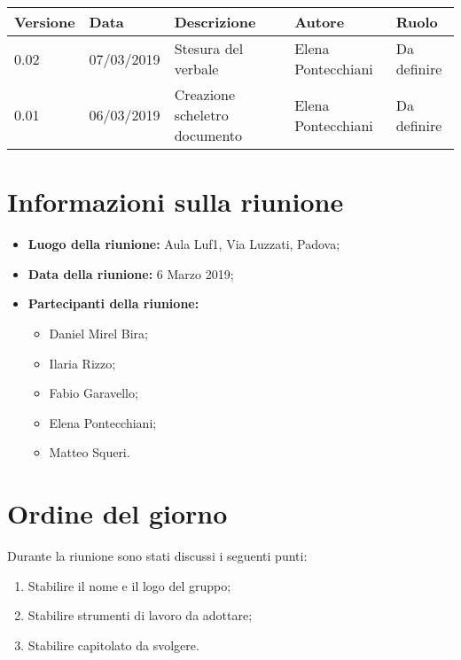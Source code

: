\documentclass[a4paper, oneside, openany, dvipsnames, table]{article}
\begin{document}
\begin{center}

{\renewcommand\arraystretch{1.2} 

\begin{tabular}{|p{2.3cm}|p{2.3cm}|p{2.3cm}|p{2.3cm}|p{2.3cm}|}

\hline
\rowcolor[gray]{.9}\textbf{Versione}          & \textbf{Data}        &  \textbf{Descrizione}          & \textbf{Autore }       &\textbf{Ruolo}                \\ \hline
\rowcolor[gray]{.7} 0.02     & 07/03/2019    & Stesura del verbale     & Elena Pontecchiani     & Da definire \\
\rowcolor[gray]{.8} 0.01     & 06/03/2019    & Creazione scheletro documento     & Elena Pontecchiani     & Da definire \\
\hline
          

\end{tabular}}
\end{center}
\newpage
\tableofcontents
\newpage
\section{Informazioni sulla riunione}
\begin{itemize}
	\item \textbf{Luogo della riunione:} Aula Luf1, Via Luzzati, Padova;
	\item \textbf{Data della riunione:} 6 Marzo 2019;
	
	\item \textbf{Partecipanti della riunione:}
		\begin{itemize}
			\item Daniel Mirel Bira;
			\item Ilaria Rizzo;
			\item Fabio Garavello;
			\item Elena Pontecchiani;
			\item Matteo Squeri.
		\end{itemize}
\end{itemize}


	
	
	
\newpage
\section{Ordine del giorno}
Durante la riunione sono stati discussi i seguenti punti:
\begin{enumerate}
	\item Stabilire il nome e il logo del gruppo;
	\item Stabilire strumenti di lavoro da adottare;
	\item Stabilire capitolato da svolgere.
		
\end{enumerate}
	
\end{document}
